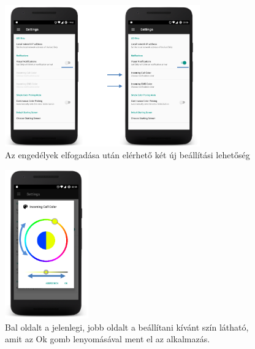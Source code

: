 \documentclass[../main.tex]{subfiles}
\begin{document}
                \begin{figure}[ht!]
                    \includegraphics[height=6.1cm]{android_res/screen_pictures/visual_notification_01.png}
                    \caption{Az engedélyek elfogadása után elérhető két új beállítási lehetőség}
                     \label{fig:vis_not_01}
                \end{figure} 
                
                
                \begin{figure}[h!]
                    \includegraphics[width=3.6cm]{android_res/screen_pictures/visual_notification_03.png}
                    \caption{Bal oldalt a jelenlegi, jobb oldalt a beállítani kívánt szín látható, amit az Ok gomb lenyomásával ment el az alkalmazás.}
                    \label{fig:vis_not_03}
                \end{figure}
            
            \newpage           
\end{document}
